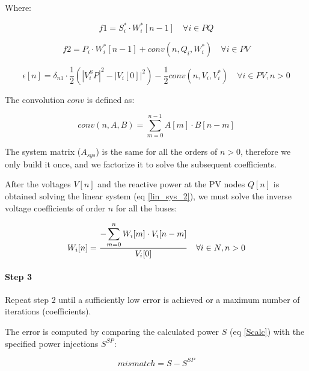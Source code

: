 \documentclass[nols,a4paper,twoside,notoc,fleqn]{tufte-book}
\begin{document}
Where:

\begin{equation}
f1 = S^*_i \cdot W^*_i[n-1] \quad \forall i \in PQ
\end{equation}

\begin{equation}
f2 = P_i \cdot W^*_i[n-1] + conv(n, Q_i, W^*_i) \quad \forall i \in PV
\end{equation}

\begin{equation}
\epsilon[n] = \delta_{n1} \cdot \frac{1}{2} \left(|V_i^SP|^2 - |V_i[0]|^2\right) - \frac{1}{2} conv(n, V_i, V_i^*)  \quad \forall i \in PV, n > 0
\end{equation}


The convolution $conv$ is defined as:

\begin{equation}
conv(n, A, B) = \sum_{m=0}^{n-1} A[m] \cdot B[n-m]
\end{equation}

The system matrix ($A_{sys}$) is the same for all the orders of $n>0$, therefore we only build it once, and we factorize it to solve the subsequent coefficients.

After the voltages ${V}[n]$ and the reactive power at the PV nodes $Q[n]$ is obtained solving the linear system (eq \ref{lin_sys_2}), we must solve the inverse voltage coefficients of order $n$ for all the buses:

\begin{equation}
W_i[n] = \frac{- \mathlarger{\sum_{m=0}^{n}W_i[m] \cdot V_i[n-m]} }{V_i[0]} \quad  \forall i \in N, n>0
\end{equation}


\paragraph{Step 3}

Repeat step 2 until a sufficiently low error is achieved or a maximum number of iterations (coefficients).


The error is computed by comparing the calculated power ${S}$ (eq \ref{Scalc}) with the specified power injections ${S}^{SP}$:

\begin{equation}
mismatch = {S} - {S}^{SP}
\end{equation}
\end{document}
